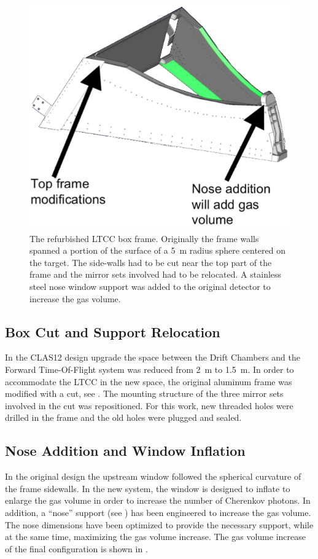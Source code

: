 \begin{figure}[htbp]
	\centering
	\includegraphics[width=1.0\columnwidth, height=0.75\columnwidth]{img/boxCut.png}
	\caption{The refurbished LTCC box frame. Originally the frame walls spanned a portion of the surface of a 5~m
          radius sphere centered on the target. The side-walls had to be cut near the top part of the frame and the mirror
          sets involved had to be relocated. A stainless steel nose window support was added to the original detector to
          increase the gas volume.}
	\label{fig:boxCut}
\end{figure}

\subsection{Box Cut and Support Relocation}
\label{sec:mirrorRepos}

In the CLAS12 design upgrade the space between the Drift Chambers and the Forward Time-Of-Flight system
was reduced from 2~m to 1.5~m. In order to accommodate the LTCC in the new space, the original aluminum frame
was modified with a cut, see . The mounting structure of the three mirror sets involved in the cut was
repositioned. For this work, new threaded holes were drilled in the frame and the old holes were plugged and sealed.

\subsection{Nose Addition and Window Inflation}

In the original design the upstream window followed the spherical curvature of the frame sidewalls. In the new system,
the window is designed to inflate to enlarge the gas volume in order to increase the number of Cherenkov photons. In
addition, a ``nose'' support (see ) has been engineered to increase the gas volume. The nose dimensions have
been optimized to provide the necessary support, while at the same time, maximizing the gas volume increase. The gas
volume increase of the final configuration is shown in .

